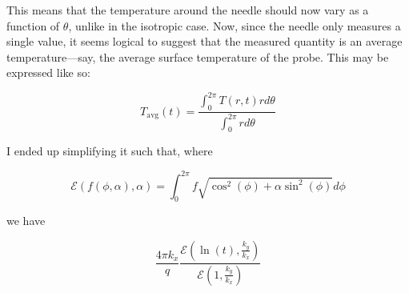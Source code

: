 This means that the temperature around the needle should now vary as a function of \(\theta\), unlike in the isotropic case. Now, since the needle only measures a single value, it seems logical to suggest that the measured quantity is an average temperature---say, the average surface temperature of the probe.  This may be expressed like so:

\begin{equation}
T_{\textrm{avg}}(t) = \frac{ \int_0^{2\pi} T(r,t) rd\theta }
                           { \int_0^{2\pi} rd\theta}
\end{equation}

I ended up simplifying it such that, where

\begin{equation}
\mathcal{E}(f(\phi, \alpha), \alpha) = \int_0^{2\pi} f\sqrt{\cos^2(\phi) + \alpha\sin^2(\phi)} d\phi
\end{equation}

we have

\begin{equation}
\frac{4\pi k_x}{q} \frac{\mathcal{E}(\ln(t), \frac{k_y}{k_x})}{\mathcal{E}(1, \frac{k_y}{k_x})}
\end{equation}



